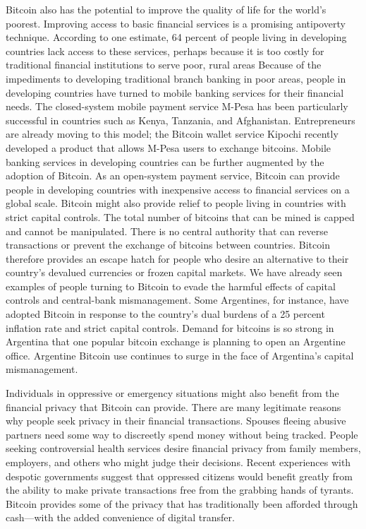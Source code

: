 Bitcoin also has the potential to improve the quality of life for the
world’s poorest. Improving access to basic financial services is a
promising antipoverty technique. According to one estimate,
64 percent of people living in developing countries lack access to
these services, perhaps because it is too costly for traditional financial
institutions to serve poor, rural areas Because of the impediments
to developing traditional branch banking in poor areas,
people in developing countries have turned to mobile banking services
for their financial needs. The closed-system mobile payment
service M-Pesa has been particularly successful in countries such
as Kenya, Tanzania, and Afghanistan. Entrepreneurs are already
moving to this model; the Bitcoin wallet service Kipochi recently
developed a product that allows M-Pesa users to exchange bitcoins.
Mobile banking services in developing countries can be
further augmented by the adoption of Bitcoin. As an open-system
payment service, Bitcoin can provide people in developing countries
with inexpensive access to financial services on a global scale.
Bitcoin might also provide relief to people living in countries
with strict capital controls. The total number of bitcoins
that can be mined is capped and cannot be manipulated. There
is no central authority that can reverse transactions or prevent
the exchange of bitcoins between countries. Bitcoin therefore
provides an escape hatch for people who desire an alternative
to their country’s devalued currencies or frozen capital markets.
We have already seen examples of people turning to Bitcoin to
evade the harmful effects of capital controls and central-bank
mismanagement. Some Argentines, for instance, have adopted
Bitcoin in response to the country’s dual burdens of a 25 percent
inflation rate and strict capital controls. Demand for bitcoins is
so strong in Argentina that one popular bitcoin exchange is planning
to open an Argentine office. Argentine Bitcoin use continues
to surge in the face of Argentina’s capital mismanagement.

Individuals in oppressive or emergency situations might
also benefit from the financial privacy that Bitcoin can provide.
There are many legitimate reasons why people seek privacy in
their financial transactions. Spouses fleeing abusive partners
need some way to discreetly spend money without being tracked.
People seeking controversial health services desire financial privacy
from family members, employers, and others who might
judge their decisions. Recent experiences with despotic
governments suggest that oppressed citizens would benefit greatly from
the ability to make private transactions free from the grabbing
hands of tyrants. Bitcoin provides some of the privacy that has
traditionally been afforded through cash—with the added convenience
of digital transfer.

